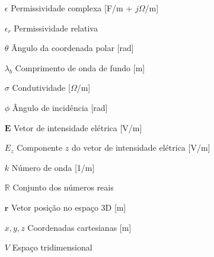 		\begin{itemize}[labelwidth=4em,leftmargin=\dimexpr{}+\relax,align=left]
			\item[$\epsilon$] Permissividade complexa [F/m + $j\Omega$/m]
			\item[$\epsilon_r$] Permissividade relativa
			\item[$\theta$] Ângulo da coordenada polar [rad]
			\item[$\lambda_b $] Comprimento de onda de fundo [m]
			\item[$\sigma$] Condutividade [$\Omega$/m]
			\item[$\phi$] Ângulo de incidência [rad]
			\item[$\mathbf{E}$] Vetor de intensidade elétrica [V/m]
			\item[$E_z$] Componente $z$ do vetor de intensidade elétrica [V/m]
			\item[$k$] Número de onda [1/m]
			\item[$\mathbb{R}$] Conjunto dos números reais
			\item[$\mathbf{r}$] Vetor posição no espaço 3D [m]
			\item[$x, y, z$] Coordenadas cartesianas [m]
			\item[$V$] Espaço tridimensional
		\end{itemize}
	
		\thispagestyle{empty}
	
	